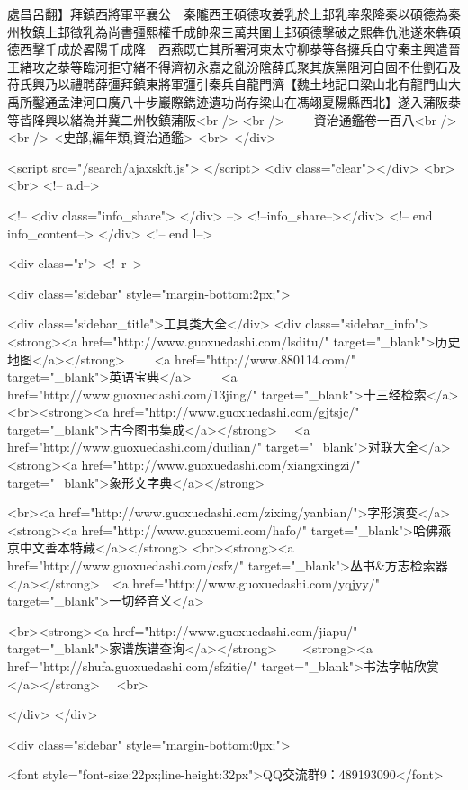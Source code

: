 處昌呂翻】拜鎮西將軍平襄公　秦隴西王碩德攻姜乳於上邽乳率衆降秦以碩德為秦州牧鎮上邽徵乳為尚書彊熙權千成帥衆三萬共圍上邽碩德擊破之熙犇仇池遂來犇碩德西擊千成於畧陽千成降　西燕既亡其所署河東太守柳㳟等各擁兵自守秦主興遣晉王緒攻之㳟等臨河拒守緒不得濟初永嘉之亂汾隂薛氏聚其族黨阻河自固不仕劉石及苻氏興乃以禮聘薛彊拜鎮東將軍彊引秦兵自龍門濟【魏土地記曰梁山北有龍門山大禹所鑿通孟津河口廣八十步巖際鐫迹遺功尚存梁山在馮翊夏陽縣西北】遂入蒲阪㳟等皆降興以緒為并冀二州牧鎮蒲阪<br />
<br />
　　資治通鑑卷一百八<br />
<br />
<史部,編年類,資治通鑑>  <br>
   </div> 

<script src="/search/ajaxskft.js"> </script>
 <div class="clear"></div>
<br>
<br>
 <!-- a.d-->

 <!--
<div class="info_share">
</div> 
-->
 <!--info_share--></div>   <!-- end info_content-->
  </div> <!-- end l-->

<div class="r">   <!--r-->



<div class="sidebar"  style="margin-bottom:2px;">

 
<div class="sidebar_title">工具类大全</div>
<div class="sidebar_info">
<strong><a href="http://www.guoxuedashi.com/lsditu/" target="_blank">历史地图</a></strong>　　
<a href="http://www.880114.com/" target="_blank">英语宝典</a>　　
<a href="http://www.guoxuedashi.com/13jing/" target="_blank">十三经检索</a>　
<br><strong><a href="http://www.guoxuedashi.com/gjtsjc/" target="_blank">古今图书集成</a></strong>　
<a href="http://www.guoxuedashi.com/duilian/" target="_blank">对联大全</a>　<strong><a href="http://www.guoxuedashi.com/xiangxingzi/" target="_blank">象形文字典</a></strong>　

<br><a href="http://www.guoxuedashi.com/zixing/yanbian/">字形演变</a>　　<strong><a href="http://www.guoxuemi.com/hafo/" target="_blank">哈佛燕京中文善本特藏</a></strong>
<br><strong><a href="http://www.guoxuedashi.com/csfz/" target="_blank">丛书&方志检索器</a></strong>　<a href="http://www.guoxuedashi.com/yqjyy/" target="_blank">一切经音义</a>　　

<br><strong><a href="http://www.guoxuedashi.com/jiapu/" target="_blank">家谱族谱查询</a></strong>　　<strong><a href="http://shufa.guoxuedashi.com/sfzitie/" target="_blank">书法字帖欣赏</a></strong>　
<br>

</div>
</div>


<div class="sidebar" style="margin-bottom:0px;">

<font style="font-size:22px;line-height:32px">QQ交流群9：489193090</font>


